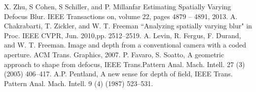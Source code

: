 \documentclass[letterpaper, 10 pt, conference]{ieeeconf}  %
\begin{document}
\begin{thebibliography}{99}

 X. Zhu, S Cohen, S Schiller, and P. Millanfar Estimating Spatially Varying Defocus Blur. IEEE Transactions on,
volume 22, pages 4879 – 4891, 2013.
 A. Chakrabarti, T. Zickler, and W. T. Freeman “Analyzing spatially varying blur" in Proc. IEEE CVPR, Jun.
2010,pp. 2512–2519.
 A. Levin, R. Fergus, F. Durand, and W. T. Freeman. Image and depth from a conventional camera with a coded
aperture. ACM Trans. Graphics, 2007.
 P. Favaro, S. Soatto, A geometric approach to shape from defocus, IEEE Trans.Pattern Anal. Mach. Intell. 27 (3) (2005) 406–417.
 A.P. Pentland, A new sense for depth of field, IEEE Trans. Pattern Anal. Mach. Intell. 9 (4) (1987) 523–531.


\end{thebibliography}
\end{document}

